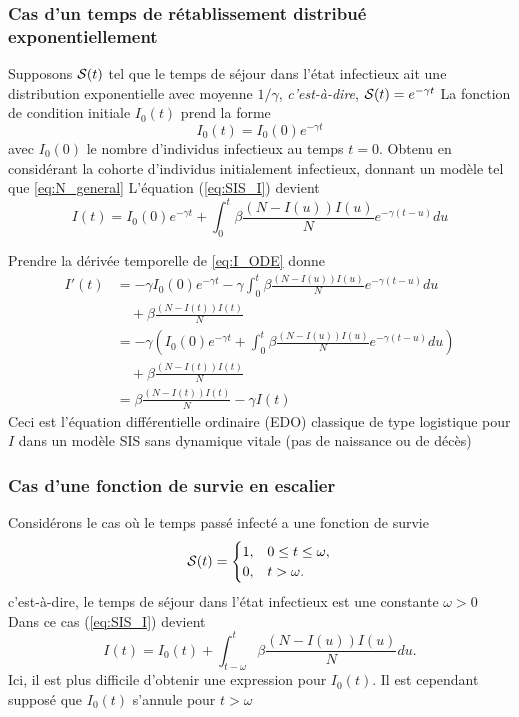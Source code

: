 \documentclass[aspectratio=169]{beamer}\usepackage[]{graphicx}\usepackage[]{xcolor}
\begin{document}
\begin{frame}\frametitle{Cas d'un temps de rétablissement distribué exponentiellement}
Supposons $\S(t)$ tel que le temps de séjour dans l'état infectieux
ait une distribution exponentielle avec moyenne $1/\gamma$,
\textit{c'est-à-dire}, $\S(t)=e^{-\gamma t}$
\vfill
La fonction de condition initiale $I_0(t)$ prend la forme
\[
I_0(t)=I_0(0)e^{-\gamma t}
\]
avec $I_0(0)$ le nombre d'individus infectieux au temps $t=0$. Obtenu en considérant la cohorte d'individus initialement infectieux, donnant un
modèle tel que \eqref{eq:N_general}
\vfill
L'équation (\ref{eq:SIS_I}) devient
\begin{equation}\label{eq:I_ODE}
I(t)=I_0(0)e^{-\gamma t}+\int_0^t \beta\frac{(N-I(u))I(u)}{N} e^{-\gamma
(t-u)}du
\end{equation}
\end{frame}

\begin{frame}
Prendre la dérivée temporelle de \eqref{eq:I_ODE} donne
\begin{align*}
I'(t) &= -\gamma I_0(0)e^{-\gamma t}-\gamma\int_0^t
\beta\frac{(N-I(u))I(u)}{N}e^{-\gamma(t-u)}du \\
&\quad +\beta \frac{(N-I(t))I(t)}{N} \\
&= -\gamma\left(I_0(0)e^{-\gamma t}+
\int_0^t \beta\frac{(N-I(u))I(u)}{N}e^{-\gamma(t-u)}du\right) \\
&\quad +\beta \frac{(N-I(t))I(t)}{N} \\
&= \beta \frac{(N-I(t))I(t)}{N}-\gamma I(t)
\end{align*}
\vfill
Ceci est l'équation différentielle ordinaire (EDO) classique de type logistique pour $I$ dans un modèle SIS sans dynamique vitale (pas de naissance ou de décès)
\end{frame}



\begin{frame}\frametitle{Cas d'une fonction de survie en escalier}
Considérons le cas où le temps passé infecté a une fonction de survie
\[
\S(t)=\begin{cases}
1, & 0\leq t\leq\omega,\\
0, & t>\omega.
\end{cases}
\]
c'est-à-dire, le temps de séjour dans l'état infectieux est une constante
$\omega>0$
\vfill
Dans ce cas (\ref{eq:SIS_I}) devient
\begin{equation}\label{eq:I_DDE}
I(t)=I_0(t)+\int_{t-\omega}^t \beta\frac{(N-I(u))I(u)}{N} du.
\end{equation}
Ici, il est plus difficile d'obtenir une expression pour $I_0(t)$. Il est cependant supposé que $I_0(t)$ s'annule pour $t>\omega$
\end{frame}
\end{document}
